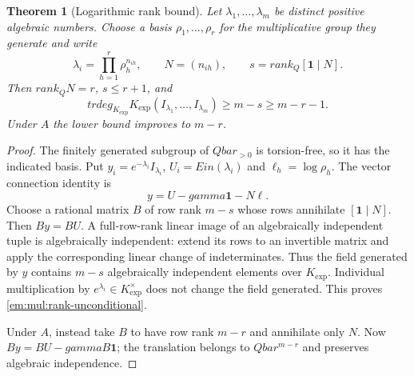 \documentclass[11pt,a4paper]{article}
\newcommand{\Q}{\mathbb Q}
\newcommand{\QB}{\overline{\mathbb Q}}
\newcommand{\Qbar}{\overline{\mathbb Q}}
\DeclareMathOperator{\Ein}{Ein}
\newtheorem{theorem}{Theorem}[section]
\theoremstyle{definition}
\theoremstyle{remark}
\theoremstyle{plain}
\numberwithin{equation}{section}
\def\Ein{Ein}\def\gamma{gamma}\def\delta{delta}\def\eta{eta}%
\def\Qbar{Qbar}\def\QB{Qbar}\def\mathbb#1{#1}%
\def\operatorname#1{#1}\def\mathrm#1{#1}}
\begin{document}
\begin{theorem}[Logarithmic rank bound]\label{em:mul:rank}
Let $\lambda_1,\ldots,\lambda_m$ be distinct positive algebraic numbers.
Choose a basis $\rho_1,\ldots,\rho_r$ for the multiplicative group they
generate and write
\[
 \lambda_i=\prod_{h=1}^r\rho_h^{n_{ih}},\qquad
 N=(n_{ih}),\qquad s=\operatorname{rank}_{\Q}[\boldsymbol1\mid N].
\]
Then $\operatorname{rank}_{\Q}N=r$, $s\le r+1$, and
\begin{equation}\label{em:mul:rank-unconditional}
 \operatorname{trdeg}_{K_{\exp}}
 K_{\exp}(I_{\lambda_1},\ldots,I_{\lambda_m})
 \ge m-s\ge m-r-1.
\end{equation}
Under $\mathrm A$ the lower bound improves to $m-r$.
\end{theorem}
\begin{proof}
The finitely generated subgroup of $\Qbar_{>0}$ is torsion-free, so it
has the indicated basis.  Put $y_i=e^{-\lambda_i}I_{\lambda_i}$,
$U_i=\Ein(\lambda_i)$ and $\ell_h=\log\rho_h$.  The vector connection
identity is
\[
 y=U-\gamma\boldsymbol1-N\ell.
\]
Choose a rational matrix $B$ of row rank $m-s$ whose rows annihilate
$[\boldsymbol1\mid N]$.  Then $By=BU$.  A full-row-rank linear image
of an algebraically independent tuple is algebraically independent:
extend its rows to an invertible matrix and apply the corresponding
linear change of indeterminates.  Thus the field generated by $y$
contains $m-s$ algebraically independent elements over $K_{\exp}$.
Individual multiplication by $e^{\lambda_i}\in K_{\exp}^{\times}$ does
not change the field generated.  This proves
\eqref{em:mul:rank-unconditional}.

Under $\mathrm A$, instead take $B$ to have row rank $m-r$ and annihilate
only $N$.  Now $By=BU-\gamma B\boldsymbol1$; the translation belongs to
$\Qbar^{m-r}$ and preserves algebraic independence.
\end{proof}
\end{document}
